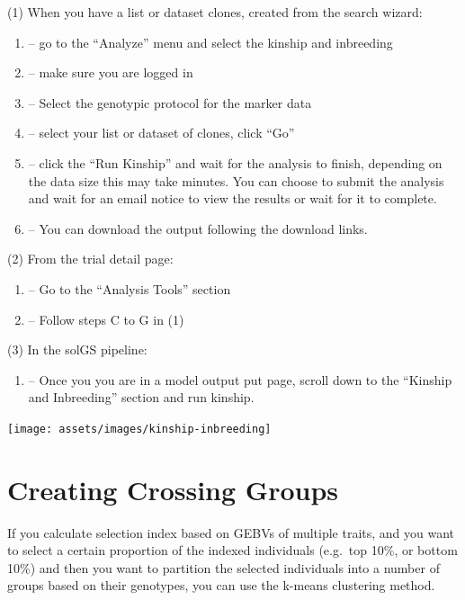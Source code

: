 \documentclass[
  12pt,
]{book}
\providecommand{\tightlist}{%
  \setlength{\itemsep}{0pt}\setlength{\parskip}{0pt}}
\begin{document}
(1) When you have a list or dataset clones, created from the search wizard:

\begin{enumerate}
\def\labelenumi{(\Alph{enumi})}
\item
  -- go to the ``Analyze'' menu and select the kinship and inbreeding
\item
  -- make sure you are logged in
\item
  -- Select the genotypic protocol for the marker data
\item
  -- select your list or dataset of clones, click ``Go''
\item
  -- click the ``Run Kinship'' and wait for the analysis to finish, depending on the data size this may take minutes. You can choose to submit the analysis and wait for an email notice to view the results or wait for it to complete.
\item
  -- You can download the output following the download links.
\end{enumerate}

(2) From the trial detail page:

\begin{enumerate}
\def\labelenumi{(\Alph{enumi})}
\item
  -- Go to the ``Analysis Tools'' section
\item
  -- Follow steps C to G in (1)
\end{enumerate}

(3) In the solGS pipeline:

\begin{enumerate}
\def\labelenumi{(\Alph{enumi})}
\tightlist
\item
  -- Once you you are in a model output put page, scroll down to the ``Kinship and Inbreeding'' section and run kinship.
\end{enumerate}

\begin{center}\texttt{[image: assets/images/kinship-inbreeding]} \end{center}

\hypertarget{creating-crossing-groups}{%
\section{Creating Crossing Groups}\label{creating-crossing-groups}}

If you calculate selection index based on GEBVs of multiple traits, and you want to select a certain proportion of the indexed individuals (e.g.~top 10\%, or bottom 10\%) and then you want to partition the selected individuals into a number of groups based on their genotypes, you can use the k-means clustering method.
\end{document}
